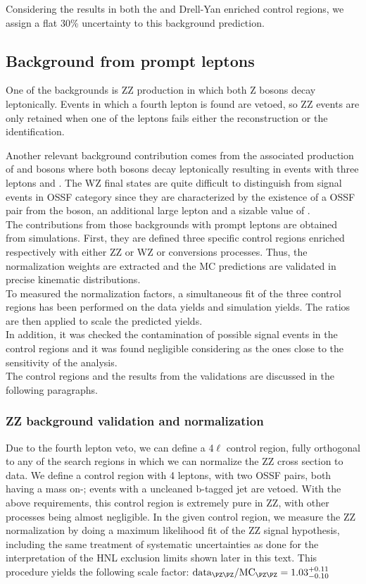 Considering the results in both the \ttbar and Drell-Yan enriched control regions, we assign a flat 30\% uncertainty to this background prediction. 

\subsection{Background from prompt leptons}
One of the backgrounds is ZZ production in which both Z bosons
decay leptonically. Events in which a fourth \fo lepton is found are vetoed, so ZZ events are only retained when one
of the leptons fails either the reconstruction or the identification.

Another relevant background contribution comes from the associated production of
\PW and \PZ bosons where both bosons decay leptonically resulting in
events with three leptons and \ptmiss. The WZ final states are quite
difficult to distinguish from signal events in OSSF category since
they are characterized by the existence of a OSSF pair from the \PZ boson, an additional large \pt lepton
and a sizable value of \ptmiss.\\

The contributions from those backgrounds with prompt leptons are obtained
from simulations. First, they are defined three specific control
regions enriched respectively with either 
ZZ or WZ or conversions processes. Thus, the normalization weights are
extracted and the MC predictions are validated in
precise kinematic distributions. \\
To measured the normalization factors, a simultaneous fit of the three
control regions has been performed on the data yields and simulation yields. 
The ratios are then
applied to scale the predicted yields.  \\
In addition, it was checked the contamination of possible signal events in the
control regions and it was found negligible considering as \mixpar the
ones close to the sensitivity of the analysis. \\
The control regions and the results from the validations are
discussed in the following paragraphs.

\subsubsection{ZZ background validation and normalization}
Due to the fourth lepton veto, we can define a 4$\ell$ control region,
fully orthogonal to any of the search regions in which we can
normalize the ZZ cross section to data. We define a control region
with 4 \ti  leptons, with two OSSF pairs, both having a mass on-\PZ;
events with a \lo uncleaned b-tagged jet are vetoed. With the above requirements, this control region is extremely pure in ZZ, with other processes being almost negligible.
In the given control region, we measure the ZZ normalization by doing a maximum likelihood fit of the ZZ signal hypothesis, including the same treatment of systematic uncertainties as done for the interpretation of the HNL exclusion limits shown later in this text. This procedure yields the following scale factor:
$\text{data}_{\PZ\PZ}/\text{MC}_{\PZ\PZ} = 1.03_{-0.10}^{+0.11}$

